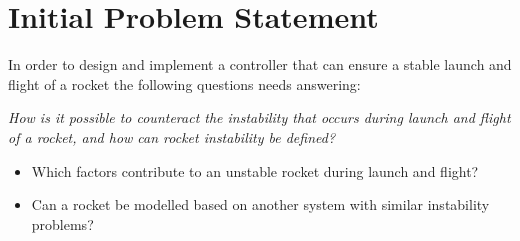 \chapter{Initial Problem Statement}
In order to design and implement a controller that can ensure a stable launch and flight of a rocket the following questions needs answering: 

\textit{How is it possible to counteract the instability that occurs during launch and flight of a rocket, and how can rocket instability be defined?}
\bigbreak
\begin{itemize}[noitemsep]
\item Which factors contribute to an unstable rocket during launch and flight?
\item Can a rocket be modelled based on another system with similar instability problems?
\end{itemize}


